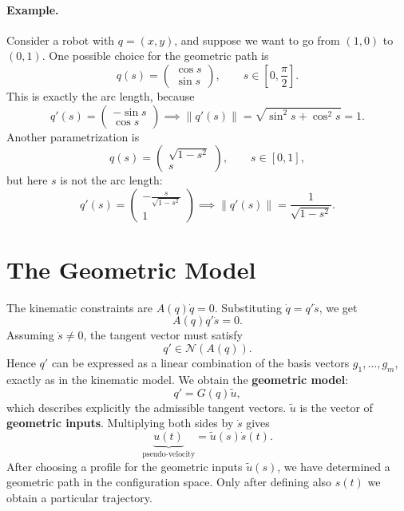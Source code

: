 \paragraph{Example.}
Consider a robot with \( q = (x, y) \), and suppose we want to go from
\( (1, 0) \) to \( (0, 1) \). One possible choice for the geometric
path is
\[
q(s) = \begin{pmatrix} \cos s \\ \sin s \end{pmatrix},
\qquad s \in \left[0, \frac{\pi}{2}\right].
\]
This is exactly the arc length, because
\[
q'(s) = \begin{pmatrix} -\sin s \\ \cos s \end{pmatrix}
\implies \|q'(s)\| = \sqrt{\sin^2 s + \cos^2 s} = 1.
\]
Another parametrization is
\[
q(s) = \begin{pmatrix} \sqrt{1 - s^2} \\ s \end{pmatrix},
\qquad s \in [0, 1],
\]
but here \( s \) is not the arc length:
\[
q'(s) = \begin{pmatrix} -\frac{s}{\sqrt{1 - s^2}} \\ 1 \end{pmatrix}
\implies \|q'(s)\| = \frac{1}{\sqrt{1 - s^2}}.
\]

\section{The Geometric Model}
\label{sec:geometric-model}

The kinematic constraints are \( A(q) \dot{q} = 0 \). Substituting
\( \dot{q} = q' \dot{s} \), we get
\[
A(q) q' \dot{s} = 0.
\]
Assuming \( \dot{s} \neq 0 \), the tangent vector must satisfy
\[
q' \in \mathcal{N}(A(q)).
\]
Hence \( q' \) can be expressed as a linear combination of the basis
vectors \( g_1, \dots, g_m \), exactly as in the kinematic model. We
obtain the \textbf{geometric model}:
\begin{equation}
    q' = G(q) \tilde{u},
\end{equation}
which describes explicitly the admissible tangent vectors.
\( \tilde{u} \) is the vector of \textbf{geometric inputs}. Multiplying
both sides by \( \dot{s} \) gives
\[
\underbrace{u(t)}_{\text{pseudo-velocity}} = \tilde{u}(s) \dot{s}(t).
\]
After choosing a profile for the geometric inputs \( \tilde{u}(s) \),
we have determined a geometric path in the configuration space. Only
after defining also \( s(t) \) we obtain a particular trajectory.

